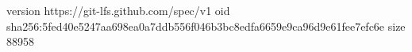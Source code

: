 version https://git-lfs.github.com/spec/v1
oid sha256:5fed40e5247aa698ea0a7ddb556f046b3bc8edfa6659e9ca96d9e61fee7efc6e
size 88958
